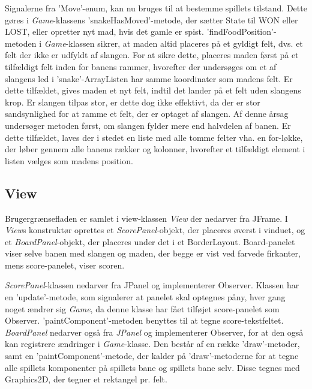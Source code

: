 Signalerne fra 'Move'-enum, kan nu bruges til at bestemme spillets tilstand. Dette gøres i \textit{Game}-klassens 'snakeHasMoved'-metode, der sætter State til WON eller LOST, eller opretter nyt mad, hvis det gamle er spist. 'findFoodPosition'-metoden i \textit{Game}-klassen sikrer, at maden altid placeres på et gyldigt felt, dvs. et felt der ikke er udfyldt af slangen. For at sikre dette, placeres maden først på et tilfældigt felt inden for banens rammer, hvorefter der undersøges om et af slangens led i 'snake'-ArrayListen har samme koordinater som madens felt. Er dette tilfældet, gives maden et nyt felt, indtil det lander på et felt uden slangens krop. Er slangen tilpas stor, er dette dog ikke effektivt, da der er stor sandsynlighed for at ramme et felt, der er optaget af slangen. Af denne årsag undersøger metoden først, om slangen fylder mere end halvdelen af banen. Er dette tilfældet, laves der i stedet en liste med alle tomme felter vha. en for-løkke, der løber gennem alle banens rækker og kolonner, hvorefter et tilfældigt element i listen vælges som madens position.

\subsection{View}
Brugergrænsefladen er samlet i view-klassen \textit{View} der nedarver fra JFrame. I \textit{View}s konstruktør oprettes et \textit{ScorePanel}-objekt, der placeres øverst i vinduet, og et \textit{BoardPanel}-objekt, der placeres under det i et BorderLayout. Board-panelet viser selve banen med slangen og maden, der begge er vist ved farvede firkanter, mens score-panelet, viser scoren.
\newline

\textit{ScorePanel}-klassen nedarver fra JPanel og implementerer Observer. Klassen har en 'update'-metode, som signalerer at panelet skal optegnes påny, hver gang noget ændrer sig \textit{Game}, da denne klasse har fået tilføjet score-panelet som Observer. 'paintComponent'-metoden benyttes til at tegne score-tekstfeltet. \textit{BoardPanel} nedarver også fra \textit{JPanel} og implementerer Observer, for at den også kan registrere ændringer i \textit{Game}-klasse. Den består af en række 'draw'-metoder, samt en 'paintComponent'-metode, der kalder på 'draw'-metoderne for at tegne alle spillets komponenter på spillets bane og spillets bane selv. Disse tegnes med Graphics2D, der tegner et rektangel pr. felt.
\newline

